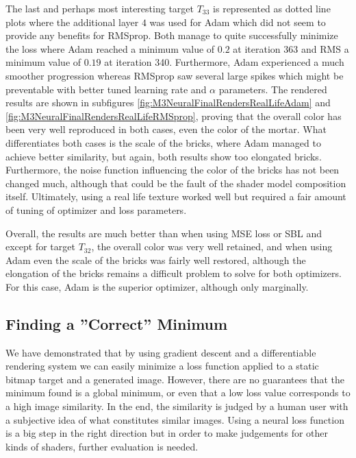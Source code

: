 The last and perhaps most interesting target $T_{33}$ is represented as dotted line plots where the additional layer $4$ was used for Adam which did not seem to provide any benefits for RMSprop. Both manage to quite successfully minimize the loss where Adam reached a minimum value of $0.2$ at iteration 363 and RMS a minimum value of $0.19$ at iteration 340. Furthermore, Adam experienced a much smoother progression whereas RMSprop saw several large spikes which might be preventable with better tuned learning rate and $\alpha$ parameters. The rendered results are shown in subfigures \ref{fig:M3NeuralFinalRendersRealLifeAdam} and \ref{fig:M3NeuralFinalRendersRealLifeRMSprop}, proving that the overall color has been very well reproduced in both cases, even the color of the mortar. What differentiates both cases is the scale of the bricks, where Adam managed to achieve better similarity, but again, both results show too elongated bricks. Furthermore, the noise function influencing the color of the bricks has not been changed much, although that could be the fault of the shader model composition itself. Ultimately, using a real life texture worked well but required a fair amount of tuning of optimizer and loss parameters.

Overall, the results are much better than when using MSE loss or SBL and except for target $T_{32}$, the overall color was very well retained, and when using Adam even the scale of the bricks was fairly well restored, although the elongation of the bricks remains a difficult problem to solve for both optimizers. For this case, Adam is the superior optimizer, although only marginally.


\subsection{Finding a ''Correct'' Minimum}

We have demonstrated that by using gradient descent and a differentiable rendering system we can easily minimize a loss function applied to a static bitmap target and a generated image. However, there are no guarantees that the minimum found is a global minimum, or even that a low loss value corresponds to a high image similarity. In the end, the similarity is judged by a human user with a subjective idea of what constitutes similar images. Using a neural loss function is a big step in the right direction but in order to make judgements for other kinds of shaders, further evaluation is needed.


